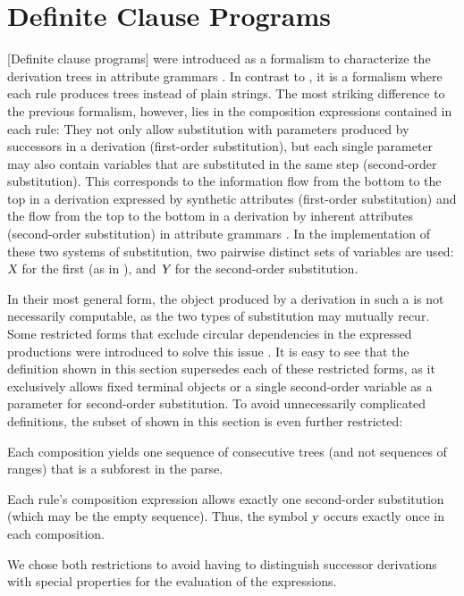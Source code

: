 \documentclass[../../document.tex]{subfiles}
\begin{document}
    \section{Definite Clause Programs}\label{sec:grammar:dcp}
    [Definite clause programs]   were introduced as a formalism to characterize the derivation trees in attribute grammars \citep{Der85}.
    In contrast to , it is a formalism where each rule produces trees instead of plain strings.
    The most striking difference to the previous formalism, however, lies in the composition expressions contained in each rule:
    They not only allow substitution with parameters produced by successors in a derivation (first-order substitution), but each single parameter may also contain variables that are substituted in the same step (second-order substitution).
    This corresponds to the information flow from the bottom to the top in a derivation expressed by synthetic attributes (first-order substitution) and the flow from the top to the bottom in a derivation by inherent attributes (second-order substitution) in attribute grammars \citep[cf.\@][Section~1]{Der88}.
    In the implementation of these two systems of substitution, two pairwise distinct sets of variables are used: \(\textsl{X}\) for the first (as in ), and \(\textsl{Y}\) for the second-order substitution.

    In their most general form, the object produced by a derivation in such a  is not necessarily computable, as the two types of substitution may mutually recur.
    Some restricted forms that exclude circular dependencies in the expressed productions were introduced to solve this issue \citep[Section~3.4 discusses non-circular attribute grammars]{Cou82}.
    It is easy to see that the definition shown in this section supersedes each of these restricted forms, as it exclusively allows fixed terminal objects or a single second-order variable as a parameter for second-order substitution.
    To avoid unnecessarily complicated definitions, the subset of  shown in this section is even further restricted:
    \begin{inparaenum}
        \item Each composition yields one sequence of consecutive trees (and not sequences of ranges) that is a subforest in the parse.
        \item Each rule's composition expression allows exactly one second-order substitution (which may be the empty sequence). Thus, the symbol \(\textsl{y}\) occurs exactly once in each composition.
    \end{inparaenum}
    We chose both restrictions to avoid having to distinguish successor derivations with special properties for the evaluation of the expressions.
\end{document}

